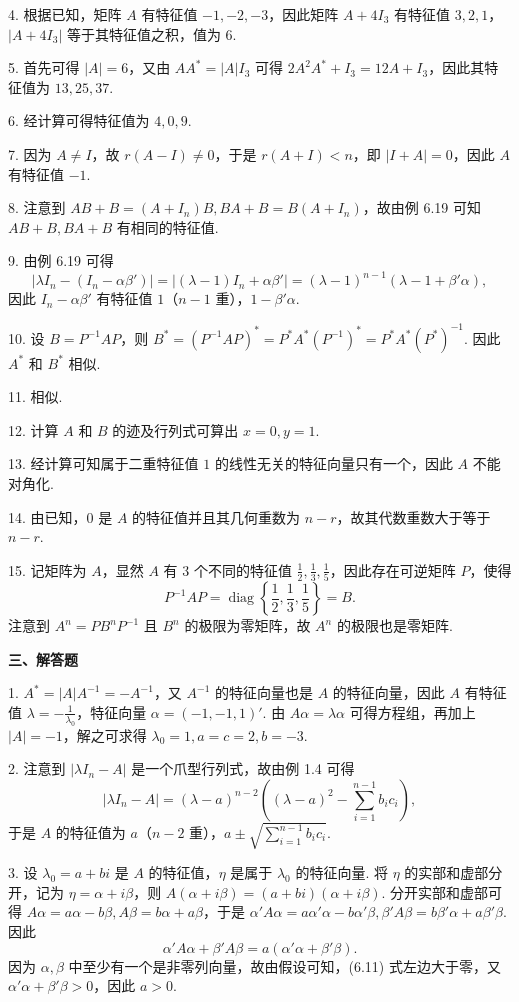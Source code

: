 \documentclass[UTF8,12pt,a4paper,fontset=fandol]{ctexart}
\begin{document}
4. 根据已知，矩阵 $A$ 有特征值 $-1,-2,-3$，因此矩阵 $A+4I_3$ 有特征值 $3,2,1$，$|A+4I_3|$ 等于其特征值之积，值为 $6$.

5. 首先可得 $|A|=6$，又由 $AA^*=|A|I_3$ 可得 $2A^2A^*+I_3=12A+I_3$，因此其特征值为 $13,25,37$.

6. 经计算可得特征值为 $4,0,9$.

7. 因为 $A\ne I$，故 $r(A-I)\ne 0$，于是 $r(A+I)<n$，即 $|I+A|=0$，因此 $A$ 有特征值 $-1$.

8. 注意到 $AB+B=(A+I_n)B,BA+B=B(A+I_n)$，故由例 6.19 可知 $AB+B,BA+B$ 有相同的特征值.

9. 由例 6.19 可得
\[
|\lambda I_n-(I_n-\alpha\beta')|=|(\lambda-1)I_n+\alpha\beta'|=(\lambda-1)^{n-1}(\lambda-1+\beta'\alpha),
\]
因此 $I_n-\alpha\beta'$ 有特征值 $1$（$n-1$ 重），$1-\beta'\alpha$.

10. 设 $B=P^{-1}AP$，则 $B^*=(P^{-1}AP)^*=P^*A^*(P^{-1})^*=P^*A^*(P^*)^{-1}$. 因此 $A^*$ 和 $B^*$ 相似.

11. 相似.

12. 计算 $A$ 和 $B$ 的迹及行列式可算出 $x=0,y=1$.

13. 经计算可知属于二重特征值 $1$ 的线性无关的特征向量只有一个，因此 $A$ 不能对角化.

14. 由已知，$0$ 是 $A$ 的特征值并且其几何重数为 $n-r$，故其代数重数大于等于 $n-r$.

15. 记矩阵为 $A$，显然 $A$ 有 $3$ 个不同的特征值 $\frac12,\frac13,\frac15$，因此存在可逆矩阵 $P$，使得
\[
P^{-1}AP=\operatorname{diag}\left\{\frac12,\frac13,\frac15\right\}=B.
\]
注意到 $A^n=PB^nP^{-1}$ 且 $B^n$ 的极限为零矩阵，故 $A^n$ 的极限也是零矩阵.

\noindent\textbf{三、解答题}

1. $A^*=|A|A^{-1}=-A^{-1}$，又 $A^{-1}$ 的特征向量也是 $A$ 的特征向量，因此 $A$ 有特征值 $\lambda=-\frac{1}{\lambda_0}$，特征向量 $\alpha=(-1,-1,1)'$. 由 $A\alpha=\lambda\alpha$ 可得方程组，再加上 $|A|=-1$，解之可求得 $\lambda_0=1,a=c=2,b=-3$.

2. 注意到 $|\lambda I_n-A|$ 是一个爪型行列式，故由例 1.4 可得
\[
|\lambda I_n-A|=(\lambda-a)^{n-2}\left((\lambda-a)^2-\sum_{i=1}^{n-1}b_ic_i\right),
\]
于是 $A$ 的特征值为 $a$（$n-2$ 重），$a\pm\sqrt{\sum_{i=1}^{n-1}b_ic_i}$.

3. 设 $\lambda_0=a+bi$ 是 $A$ 的特征值，$\eta$ 是属于 $\lambda_0$ 的特征向量. 将 $\eta$ 的实部和虚部分开，记为 $\eta=\alpha+i\beta$，则 $A(\alpha+i\beta)=(a+bi)(\alpha+i\beta)$. 分开实部和虚部可得 $A\alpha=a\alpha-b\beta,A\beta=b\alpha+a\beta$，于是 $\alpha'A\alpha=a\alpha'\alpha-b\alpha'\beta,\beta'A\beta=b\beta'\alpha+a\beta'\beta$. 因此
\begin{equation}
\alpha'A\alpha+\beta'A\beta=a(\alpha'\alpha+\beta'\beta). \tag{6.11}
\end{equation}
因为 $\alpha,\beta$ 中至少有一个是非零列向量，故由假设可知，(6.11) 式左边大于零，又 $\alpha'\alpha+\beta'\beta>0$，因此 $a>0$.
\end{document}
